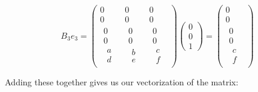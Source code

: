 \documentclass[oneside,english]{amsbook}
\numberwithin{section}{chapter}
\theoremstyle{plain}
\theoremstyle{definition}
\begin{document}
\[B_{3}e_{3} = \begin{pmatrix}
	0 & 0 & 0 \\
	0 & 0 & 0 \\
	\begin{matrix}
		0 \\
		0 \\
		\begin{matrix}
			a \\
			d
		\end{matrix}
	\end{matrix} & \begin{matrix}
		0 \\
		0 \\
		\begin{matrix}
			b \\
			e
		\end{matrix}
	\end{matrix} & \begin{matrix}
		0 \\
		0 \\
		\begin{matrix}
			c \\
			f
		\end{matrix}
	\end{matrix}
\end{pmatrix}\begin{pmatrix}
	0 \\
	0 \\
	1
\end{pmatrix} = \begin{pmatrix}
	0 \\
	0 \\
	\begin{matrix}
		0 \\
		0 \\
		\begin{matrix}
			c \\
			f
		\end{matrix}
	\end{matrix}
\end{pmatrix}\]

Adding these together gives us our vectorization of the matrix:
\end{document}
